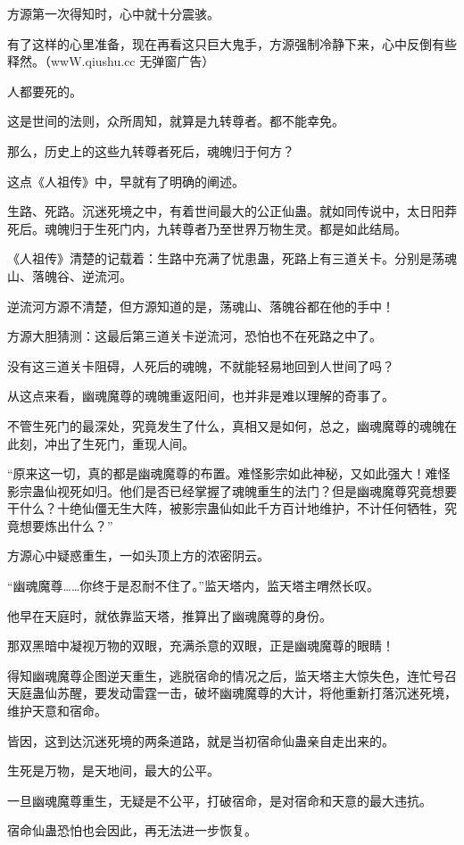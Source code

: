 \begin{this_body}
方源第一次得知时，心中就十分震骇。

有了这样的心里准备，现在再看这只巨大鬼手，方源强制冷静下来，心中反倒有些释然。（wwW.qiushu.cc 无弹窗广告）

人都要死的。

这是世间的法则，众所周知，就算是九转尊者。都不能幸免。

那么，历史上的这些九转尊者死后，魂魄归于何方？

这点《人祖传》中，早就有了明确的阐述。

生路、死路。沉迷死境之中，有着世间最大的公正仙蛊。就如同传说中，太日阳莽死后。魂魄归于生死门内，九转尊者乃至世界万物生灵。都是如此结局。

《人祖传》清楚的记载着：生路中充满了忧患蛊，死路上有三道关卡。分别是荡魂山、落魄谷、逆流河。

逆流河方源不清楚，但方源知道的是，荡魂山、落魄谷都在他的手中！

方源大胆猜测：这最后第三道关卡逆流河，恐怕也不在死路之中了。

没有这三道关卡阻碍，人死后的魂魄，不就能轻易地回到人世间了吗？

从这点来看，幽魂魔尊的魂魄重返阳间，也并非是难以理解的奇事了。

不管生死门的最深处，究竟发生了什么，真相又是如何，总之，幽魂魔尊的魂魄在此刻，冲出了生死门，重现人间。

“原来这一切，真的都是幽魂魔尊的布置。难怪影宗如此神秘，又如此强大！难怪影宗蛊仙视死如归。他们是否已经掌握了魂魄重生的法门？但是幽魂魔尊究竟想要干什么？十绝仙僵无生大阵，被影宗蛊仙如此千方百计地维护，不计任何牺牲，究竟想要炼出什么？”

方源心中疑惑重生，一如头顶上方的浓密阴云。

“幽魂魔尊……你终于是忍耐不住了。”监天塔内，监天塔主喟然长叹。

他早在天庭时，就依靠监天塔，推算出了幽魂魔尊的身份。

那双黑暗中凝视万物的双眼，充满杀意的双眼，正是幽魂魔尊的眼睛！

得知幽魂魔尊企图逆天重生，逃脱宿命的情况之后，监天塔主大惊失色，连忙号召天庭蛊仙苏醒，要发动雷霆一击，破坏幽魂魔尊的大计，将他重新打落沉迷死境，维护天意和宿命。

皆因，这到达沉迷死境的两条道路，就是当初宿命仙蛊亲自走出来的。

生死是万物，是天地间，最大的公平。

一旦幽魂魔尊重生，无疑是不公平，打破宿命，是对宿命和天意的最大违抗。

宿命仙蛊恐怕也会因此，再无法进一步恢复。


\end{this_body}
